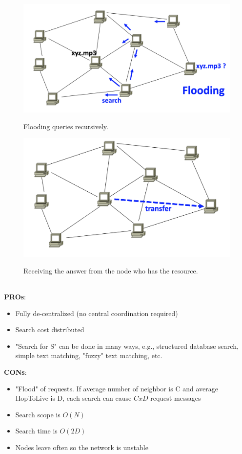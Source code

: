 \documentclass[10pt,a4paper]{article}
\begin{document}
\begin{figure}[h!]
\centering
\begin{minipage}{.5\textwidth}
  \centering
  \includegraphics[width=.5\linewidth]{images/gnutella-search1.png}
  \label{fig:gnutella-search1}
  \caption{Flooding queries recursively.}
\end{minipage}%
\begin{minipage}{.5\textwidth}
  \centering
  \includegraphics[width=.5\linewidth]{images/gnutella-search2.png}
  \label{fig:gnutella-search2}
  \caption{Receiving the answer from the node who has the resource.}
\end{minipage}
\end{figure}  \\
\textbf{PROs}:
\begin{itemize}
	\item Fully de-centralized (no central coordination required)
	\item Search cost distributed
	\item "Search for S" can be done in many ways, e.g., structured database search, simple text matching, "fuzzy" text matching, etc.
\end{itemize}
\textbf{CONs}:
\begin{itemize}
	\item "Flood" of requests. If average number of neighbor is C and average HopToLive is D, each search can cause $CxD$ request messages
	\item Search scope is $O(N)$
	\item Search time is $O(2D)$
	\item Nodes leave often so the network is unstable
\end{itemize}
\end{document}

